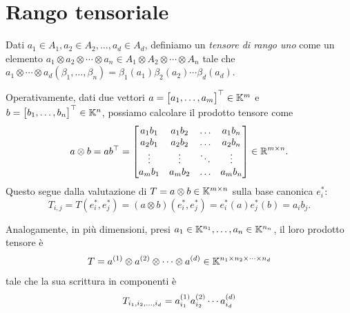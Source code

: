 \section{Rango tensoriale}

\begin{definition}
	Dati $ a_1 \in A_1, a_2 \in A_2, \ldots, a_{d} \in A_{d} $, definiamo un \emph{tensore di rango
		uno} come un elemento $ a_1 \otimes a_2 \otimes \cdots \otimes a_{n} \in A_1
		\otimes A_2 \otimes \cdots \otimes A_{n}$ tale che $ a_1 \otimes \cdots \otimes a_{d}(\beta_1, \ldots,
		\beta_{n}) = \beta_1(a_1)\beta_2(a_2) \cdots \beta_{d}(a_{d}) $.
\end{definition}

Operativamente, dati due vettori $ a = \begin{bmatrix} a_1, \ldots, a_m \end{bmatrix}^{\top} \in \mathbb{K}^m $ e $ b =
	\begin{bmatrix} b_1, \ldots, b_n \end{bmatrix}^{\top} \in \mathbb{K}^n  $, possiamo calcolare il prodotto
tensore come
\begin{equation*}
	a \otimes b = ab^{\top} =
	\begin{bmatrix} a_1b_1 & a_1b_2 & \ldots & a_1b_n \\ a_2b_1 & a_2b_2 &
                \ldots & a_2b_n                   \\
                \vdots & \vdots & \ddots & \vdots \\
                a_mb_1 & a_mb_2 & \ldots & a_mb_n
	\end{bmatrix} \in \mathbb{R}^{m\times n}.
\end{equation*}
Questo segue dalla valutazione di $ T = a \otimes b \in \mathbb{K}^{m \times n}$ sulla base canonica $
	e_{i}^* $:
\begin{equation*}
	T_{i,j} = T(e_{i}^*, e_{j}^*) = (a \otimes b)(e_{i}^*, e_{j}^*) = e_{i}^*(a) e_{j}^*(b) = a_{i}b_{j}.
\end{equation*}

Analogamente, in più dimensioni, presi $ a_{1} \in \mathbb{K}^{n_1}, \ldots, a_{n} \in \mathbb{K}^{n_n} $, il loro prodotto tensore è
\begin{equation}
	\label{eq:rk1}
	T = a^{(1)} \otimes a^{(2)} \otimes \cdots \otimes a^{(d)} \in \mathbb{K}^{n_1 \times n_2 \times \cdots \times
		n_{d}}
\end{equation}
tale che la sua scrittura in componenti è
\begin{equation}
	\label{eq:rk1_components}
	T_{\miwc} = a_{i_1}^{(1)}a_{i_2}^{(2)} \cdots a_{i_d}^{(d)}
\end{equation}

